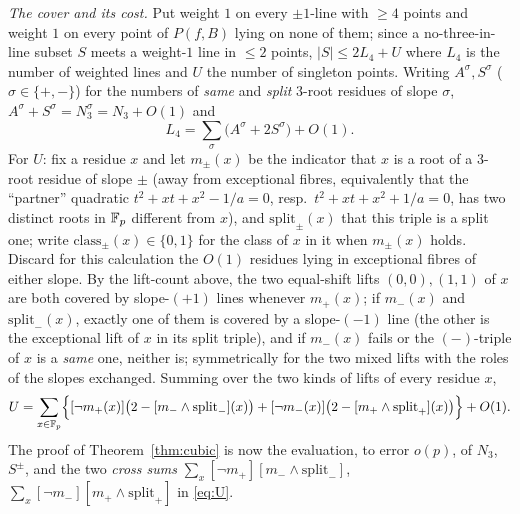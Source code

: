 \smallskip\noindent\emph{The cover and its cost.} Put weight $1$ on every $\pm1$-line with $\ge4$ points and
weight $1$ on every point of $P(f,B)$ lying on none of them; since a no-three-in-line subset $S$ meets a weight-$1$
line in $\le2$ points, $|S|\le2L_4+U$ where $L_4$ is the number of weighted lines and $U$ the number of singleton
points. Writing $A^\sigma,S^\sigma$ ($\sigma\in\{+,-\}$) for the numbers of \emph{same} and \emph{split} $3$-root
residues of slope $\sigma$, $A^\sigma+S^\sigma=N_3^\sigma=N_3+O(1)$ and
\[
L_4=\sum_\sigma\bigl(A^\sigma+2S^\sigma\bigr)+O(1).
\]
For $U$: fix a residue $x$ and let $m_\pm(x)$ be the indicator that $x$ is a root of a $3$-root residue of slope
$\pm$ (away from exceptional fibres, equivalently that the ``partner'' quadratic $t^2+xt+x^2-1/a=0$, resp.\ $t^2+xt+x^2+1/a=0$, has two distinct
roots in $\mathbb{F}_p$ different from $x$), and $\mathrm{split}_\pm(x)$ that this triple is a split one; write $\mathrm{class}_\pm(x)\in\{0,1\}$
for the class of $x$ in it when $m_\pm(x)$ holds. Discard for this calculation the $O(1)$ residues lying in exceptional fibres of either slope.
By the lift-count above, the two equal-shift lifts $(0,0),(1,1)$ of $x$ are both
covered by slope-$(+1)$ lines whenever $m_+(x)$; if $m_-(x)$ and $\mathrm{split}_-(x)$, exactly one of them is covered
by a slope-$(-1)$ line (the other is the exceptional lift of $x$ in its split triple), and if $m_-(x)$ fails or the
$(-)$-triple of $x$ is a \emph{same} one, neither is; symmetrically for the two mixed lifts with the roles of the slopes
exchanged. Summing over the two kinds of lifts of every residue $x$,
\begin{equation}\label{eq:U}
U=\sum_{x\in\mathbb{F}_p}\Bigl\{[\neg m_+(x)]\bigl(2-[m_-\wedge\mathrm{split}_-](x)\bigr)+[\neg m_-(x)]\bigl(2-[m_+\wedge\mathrm{split}_+](x)\bigr)\Bigr\}+O(1).
\end{equation}
The proof of Theorem~\ref{thm:cubic} is now the evaluation, to error $o(p)$, of $N_3$, $S^\pm$, and the
two \emph{cross sums} $\sum_x[\neg m_+][m_-\wedge\mathrm{split}_-]$, $\sum_x[\neg m_-][m_+\wedge\mathrm{split}_+]$
in \eqref{eq:U}.


